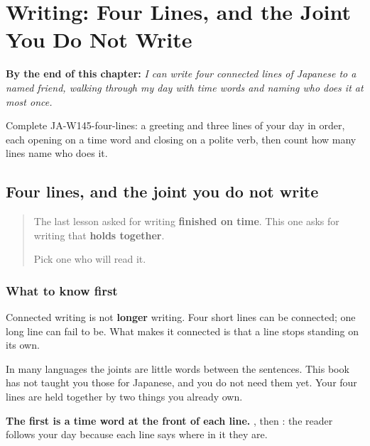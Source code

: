 
\chapter{Writing: Four Lines, and the Joint You Do Not Write}
\label{ch:ja-writing-four-lines}

\begin{chapteropening}
\textbf{By the end of this chapter:} \emph{I can write four connected lines of Japanese to a named friend, walking through my day with time words and naming who does it at most once.}

Complete JA-W145-four-lines: a greeting and three lines of your day in order, each opening on a time word and closing on a polite verb, then count how many lines name who does it.
\end{chapteropening}

\section[(four lines)]{Four lines, and the joint you do not write}

\label{lesson:JA-W145-four-lines}



\begin{quote}
The last lesson asked for writing \textbf{finished on time}. This one asks for writing that \textbf{holds together}.

Pick one \textbf{} who will read it.
\end{quote}

\subsection*{What to know first}
Connected writing is not \textbf{longer} writing. Four short lines can be connected; one long line can fail to be. What makes it connected is that a line stops standing on its own.

In many languages the joints are little words between the sentences. This book has not taught you those for Japanese, and you do not need them yet. Your four lines are held together by two things you already own.

\textbf{The first is a time word at the front of each line.} \textbf{}, then \textbf{}: the reader follows your day because each line says where in it they are.

